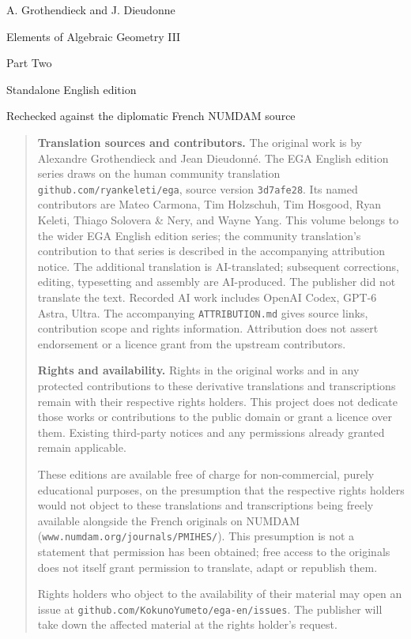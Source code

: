 \documentclass[10pt,oneside]{book}
\begin{document}
\begin{titlepage}
  \centering
  {\Large A. Grothendieck and J. Dieudonne\par}
  \vfill
  {\Huge Elements of Algebraic Geometry III\par}
  \vspace{1.5ex}
  {\LARGE Part Two\par}
  \vfill
  {\large Standalone English edition\par}
  \vspace{1ex}
  {\small Rechecked against the diplomatic French NUMDAM source\par}
\end{titlepage}


\begingroup
\small
\raggedright
\begin{quote}
\textbf{Translation sources and contributors.}
The original work is by Alexandre Grothendieck and Jean Dieudonn\'e.
The EGA English edition series draws on the human community translation
\texttt{github.com/ryankeleti/ega}, source version \texttt{3d7afe28}.
Its named contributors are Mateo Carmona, Tim Holzschuh, Tim Hosgood,
Ryan Keleti, Thiago Solovera \& Nery, and Wayne Yang.
This volume belongs to the wider EGA English edition series; the community translation's contribution to that series is described in the accompanying attribution notice.
The additional translation is AI-translated; subsequent corrections, editing,
typesetting and assembly are AI-produced. The publisher did not translate
the text. Recorded AI work includes OpenAI Codex,
GPT-6 Astra, Ultra.
The accompanying \texttt{ATTRIBUTION.md} gives source links, contribution
scope and rights information. Attribution does not assert endorsement
or a licence grant from the upstream contributors.

\medskip
\textbf{Rights and availability.}
Rights in the original works and in any protected contributions to these
derivative translations and transcriptions remain with their respective
rights holders. This project does not dedicate those works or contributions
to the public domain or grant a licence over them. Existing third-party
notices and any permissions already granted remain applicable.

These editions are available free of charge for non-commercial, purely
educational purposes, on the presumption that the respective rights holders
would not object to these translations and transcriptions being freely
available alongside the French originals on NUMDAM
(\texttt{www.numdam.org/journals/PMIHES/}). This presumption is not a statement
that permission has been obtained; free access to the originals does not
itself grant permission to translate, adapt or republish them.

Rights holders who object to the availability of their material may open
an issue at \texttt{github.com/KokunoYumeto/ega-en/issues}. The publisher
will take down the affected material at the rights holder's request.
\end{quote}
\endgroup


\setcounter{section}{5}
\setcounter{subsection}{0}
\setcounter{equation}{0}
\setcounter{footnote}{0}


\end{document}
